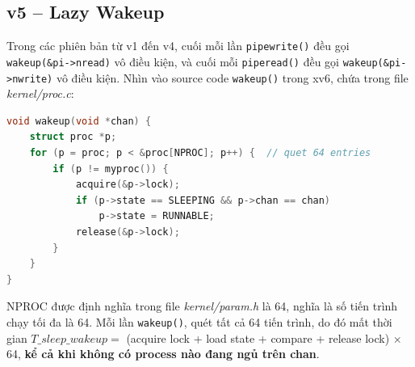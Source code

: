 \documentclass[12pt,a4paper]{article}
\newcommand{\code}[1]{\texttt{#1}}
\begin{document}

\subsection{v5 -- Lazy Wakeup}

Trong các phiên bản từ v1 đến v4, cuối mỗi lần \code{pipewrite()} đều gọi \code{wakeup(\&pi->nread)} vô
điều kiện, và cuối mỗi \code{piperead()} đều gọi \code{wakeup(\&pi->nwrite)} vô điều
kiện. Nhìn vào source code \code{wakeup()} trong xv6, chứa trong file \textit{kernel/proc.c}:

\begin{lstlisting}[caption = {wakeup()},language=C]
void wakeup(void *chan) {
    struct proc *p;
    for (p = proc; p < &proc[NPROC]; p++) {  // quet 64 entries
        if (p != myproc()) {
            acquire(&p->lock);
            if (p->state == SLEEPING && p->chan == chan)
                p->state = RUNNABLE;
            release(&p->lock);
        }
    }
}
\end{lstlisting}

NPROC được định nghĩa trong file \textit{kernel/param.h} là 64, nghĩa là số tiến trình chạy tối đa là 64. 
Mỗi lần \code{wakeup()}, quét tất cả 64 tiến trình, do đó mất thời gian $T\_sleep\_wakeup = $
(acquire lock + load state + compare + release lock) $\times$ 64, \textbf{kể cả khi không có process nào đang ngủ trên chan}. \\
\end{document}
